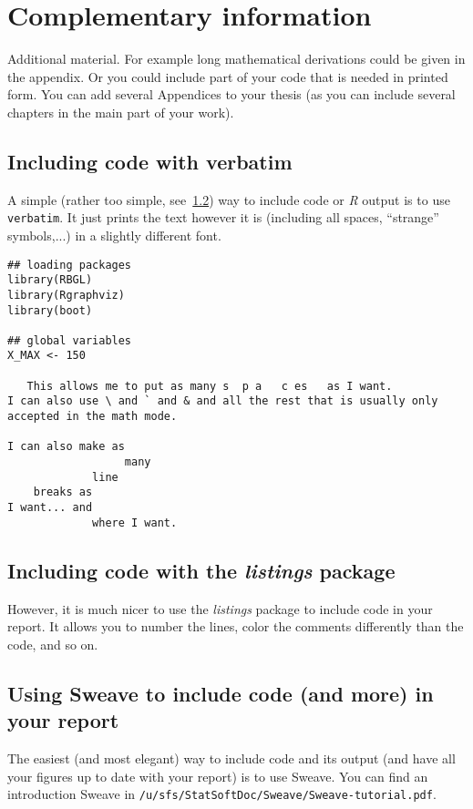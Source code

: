 \chapter{Complementary information}
\label{app:complement}

Additional material. For example long mathematical derivations could be
given in the appendix. Or you could include part of your code that is
needed in printed form. You can add several Appendices to your thesis (as
you can include several chapters in the main part of your work).

\section{Including \Rp code with verbatim}
A simple (rather too simple, see~\ref{App:listings}) way to include code or
{\it R} output is to use 
\texttt{verbatim}. It just prints the text however it is (including all
spaces, ``strange'' symbols,...) in a slightly different font.
\begin{verbatim}
## loading packages
library(RBGL)
library(Rgraphviz)
library(boot)

## global variables
X_MAX <- 150

   This allows me to put as many s  p a   c es   as I want.
I can also use \ and ` and & and all the rest that is usually only 
accepted in the math mode.

I can also make as 
                  many 
             line 
    breaks as 
I want... and
             where I want. 
\end{verbatim}

\section{Including \Rp code with the \emph{listings} package}\label{App:listings}
However, it is much nicer to use the \emph{listings} package to include \Rp
code in your report. It allows you to number the lines, color the comments
differently than the code, and so on.




\section{Using Sweave to include \Rp code (and more) in your report}
The easiest (and most elegant) way to include \Rp code and its output (and
have all your figures up to date with your report) is to use Sweave. You
can find an introduction Sweave in \texttt{/u/sfs/StatSoftDoc/Sweave/Sweave-tutorial.pdf}.

